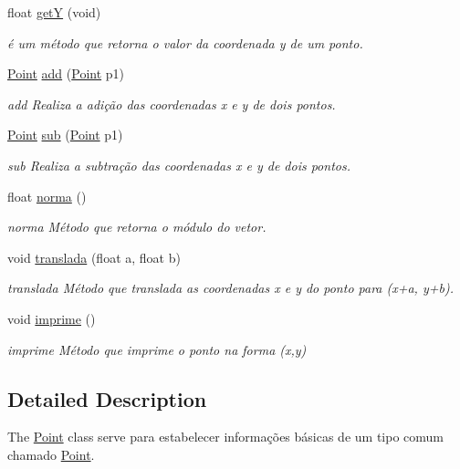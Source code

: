 \begin{DoxyCompactItemize}
float \hyperlink{classPoint_a2444daa96871c89614510bc4bfcd19ce}{getY} (void)
\begin{DoxyCompactList}\small\item\em é um método que retorna o valor da coordenada y de um ponto. \end{DoxyCompactList}\item 
\hyperlink{classPoint}{Point} \hyperlink{classPoint_a9dbea84b07b0a8ec3bbb9e58b3d15899}{add} (\hyperlink{classPoint}{Point} p1)
\begin{DoxyCompactList}\small\item\em add Realiza a adição das coordenadas x e y de dois pontos. \end{DoxyCompactList}\item 
\hyperlink{classPoint}{Point} \hyperlink{classPoint_a9cf2c53b0a4e6282a6712824bb4e9b00}{sub} (\hyperlink{classPoint}{Point} p1)
\begin{DoxyCompactList}\small\item\em sub Realiza a subtração das coordenadas x e y de dois pontos. \end{DoxyCompactList}\item 
float \hyperlink{classPoint_abd2618d1f505d9392893273a66e7c9b2}{norma} ()
\begin{DoxyCompactList}\small\item\em norma Método que retorna o módulo do vetor. \end{DoxyCompactList}\item 
void \hyperlink{classPoint_ad9676e36f3444534b609e3c68422239a}{translada} (float a, float b)
\begin{DoxyCompactList}\small\item\em translada Método que translada as coordenadas x e y do ponto para (x+a, y+b). \end{DoxyCompactList}\item 
\mbox{\label{classPoint_a1fb5c2501c27ab2cbc99d06c2a26a741}} 
void \hyperlink{classPoint_a1fb5c2501c27ab2cbc99d06c2a26a741}{imprime} ()
\begin{DoxyCompactList}\small\item\em imprime Método que imprime o ponto na forma (x,y) \end{DoxyCompactList}\end{DoxyCompactItemize}


\subsection{Detailed Description}
The \hyperlink{classPoint}{Point} class serve para estabelecer informações básicas de um tipo comum chamado \hyperlink{classPoint}{Point}. 

